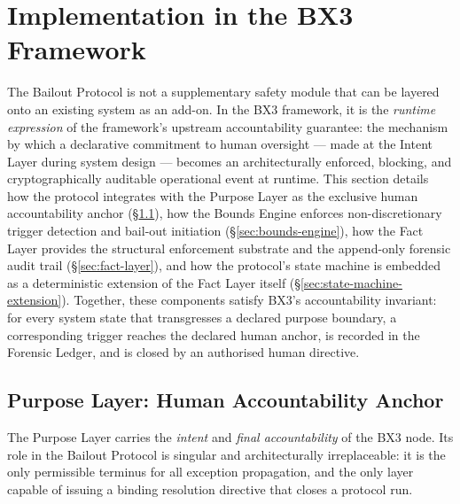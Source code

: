 
\section{Implementation in the BX3 Framework}
\label{sec:bailout-implementation}

The Bailout Protocol is not a supplementary safety module that can be layered onto an existing system as an add-on. In the BX3 framework, it is the \emph{runtime expression} of the framework's upstream accountability guarantee: the mechanism by which a declarative commitment to human oversight — made at the Intent Layer during system design — becomes an architecturally enforced, blocking, and cryptographically auditable operational event at runtime. This section details how the protocol integrates with the Purpose Layer as the exclusive human accountability anchor (\S\ref{sec:purpose-layer}), how the Bounds Engine enforces non-discretionary trigger detection and bail-out initiation (\S\ref{sec:bounds-engine}), how the Fact Layer provides the structural enforcement substrate and the append-only forensic audit trail (\S\ref{sec:fact-layer}), and how the protocol's state machine is embedded as a deterministic extension of the Fact Layer itself (\S\ref{sec:state-machine-extension}). Together, these components satisfy BX3's accountability invariant: for every system state that transgresses a declared purpose boundary, a corresponding trigger reaches the declared human anchor, is recorded in the Forensic Ledger, and is closed by an authorised human directive.

\subsection{Purpose Layer: Human Accountability Anchor}
\label{sec:purpose-layer}

The Purpose Layer carries the \emph{intent} and \emph{final accountability} of the BX3 node. Its role in the Bailout Protocol is singular and architecturally irreplaceable: it is the only permissible terminus for all exception propagation, and the only layer capable of issuing a binding resolution directive that closes a protocol run.

